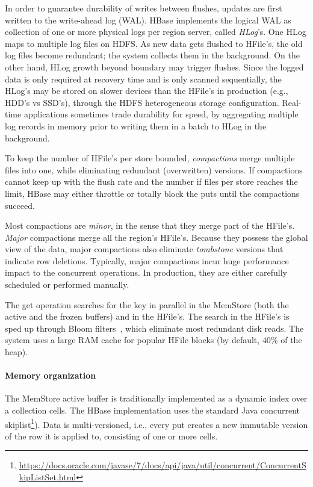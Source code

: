 In order to guarantee durability of writes between flushes, updates are first written to 
the write-ahead log (WAL). HBase implements the logical WAL as collection of one or more physical 
logs per region server, called \emph{HLog}'s. One HLog maps to multiple log files on HDFS. 
As new data gets flushed to HFile's, the old log files become redundant; the system collects 
them in the background. On the other hand, HLog growth beyond boundary may trigger flushes. 
Since the logged data is only required at recovery time and is only scanned sequentially, the HLog's 
may be stored on slower devices than the HFile's in production (e.g., HDD's vs SSD's),
through the HDFS heterogeneous storage configuration. Real-time applications sometimes 
trade durability for speed, by aggregating multiple log records in memory prior to writing 
them in a batch to HLog in the background. 

To keep the number of HFile's per store bounded, \emph{compactions} merge multiple files 
into one, while eliminating redundant (overwritten) versions. If compactions cannot keep up
with the flush rate and the number if files per store reaches the limit, HBase may either throttle 
or totally block the puts until the compactions succeed. 

Most compactions are \emph{minor}, 
in the sense that they merge part of the HFile's. \emph{Major} compactions merge all the region's 
HFile's. Because they possess the global view of the data, major compactions also eliminate 
{\em tombstone} versions that indicate row deletions. Typically, major compactions incur huge 
performance impact to the concurrent operations. In production, they are either carefully scheduled 
or performed manually. 

The get operation searches for the key in parallel in the MemStore (both the active and the 
frozen buffers) and in the HFile's. The search in the HFile's is sped up through Bloom 
filters~\cite{Chang2008}, which eliminate most redundant disk reads. The system 
uses a large RAM cache for popular HFile blocks (by default, $40\%$ of the heap).

\paragraph{Memory organization}
The MemStore active buffer is traditionally implemented as a dynamic index over a collection cells.  
The HBase implementation uses the standard Java concurrent skiplist\footnote{\small{\url{https://docs.oracle.com/javase/7/docs/api/java/util/concurrent/ConcurrentSkipListSet.html}}}).
Data is multi-versioned, i.e., every put creates a new immutable version of the row it is applied to, 
consisting of one or more cells. 

